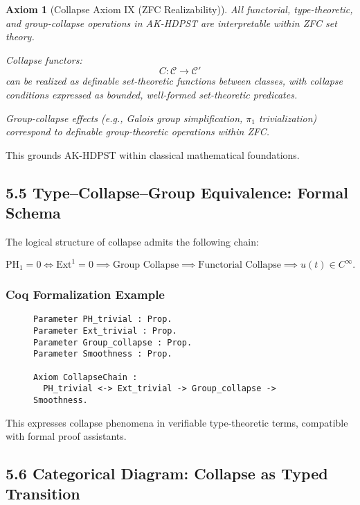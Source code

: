 \documentclass[11pt]{article}
\newtheorem{axiom}{Axiom}[section]
\begin{document}
\begin{axiom}[Collapse Axiom IX (ZFC Realizability)]
All functorial, type-theoretic, and group-collapse operations in AK-HDPST are interpretable within ZFC set theory.

Collapse functors:
\[
C: \mathcal{C} \to \mathcal{C}'
\]
can be realized as definable set-theoretic functions between classes,  
with collapse conditions expressed as bounded, well-formed set-theoretic predicates.

Group-collapse effects (e.g., Galois group simplification, \(\pi_1\) trivialization) correspond to definable group-theoretic operations within ZFC.
\end{axiom}

This grounds AK-HDPST within classical mathematical foundations.

\subsection*{5.5 Type–Collapse–Group Equivalence: Formal Schema}

The logical structure of collapse admits the following chain:

\[
\mathrm{PH}_1 = 0 \iff \mathrm{Ext}^1 = 0 \implies \text{Group Collapse} \implies \text{Functorial Collapse} \implies u(t) \in C^\infty.
\]

\subsubsection*{Coq Formalization Example}

\begin{figure}[h]
\centering
\begin{lstlisting}[language=Coq, caption=Collapse Typing and Group Collapse Schema]
Parameter PH_trivial : Prop.
Parameter Ext_trivial : Prop.
Parameter Group_collapse : Prop.
Parameter Smoothness : Prop.

Axiom CollapseChain :
  PH_trivial <-> Ext_trivial -> Group_collapse -> Smoothness.
\end{lstlisting}
\end{figure}


This expresses collapse phenomena in verifiable type-theoretic terms, compatible with formal proof assistants.

\subsection*{5.6 Categorical Diagram: Collapse as Typed Transition}
\end{document}
